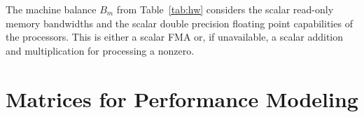 The machine balance $B_m$ from Table~\ref{tab:hw} considers the scalar read-only
memory bandwidths and the scalar double precision floating point capabilities of
the processors. 
This is either a scalar FMA or, if unavailable, a scalar addition and
multiplication for processing a nonzero.

%



\section{Matrices for Performance Modeling}

